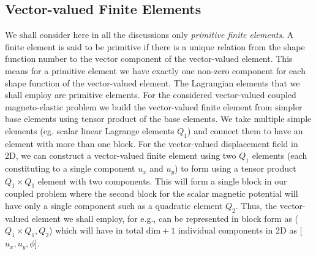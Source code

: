 \documentclass[11pt,a4paper,final]{article}
\begin{document}
\subsection{\textbf{Vector-valued Finite Elements}} We shall consider here in all the discussions only \textit{primitive finite elements}. A finite element is said to be primitive if there is a unique relation from the shape function number to the vector component of the vector-valued element. This means for a primitive element we have exactly one non-zero component for each shape function of the vector-valued element. The Lagrangian elements that we shall employ are primitive elements. For the considered vector-valued coupled magneto-elastic problem we build the vector-valued finite element from simpler base elements using tensor product of the base elements. We take multiple simple elements (eg. scalar linear Lagrange elements $Q_1$) and connect them to have an element with more than one block. For the vector-valued displacement field in 2D, we can construct a vector-valued finite element using two $Q_1$ elements (each constituting to a single component $u_x$ and $u_y$) to form using a tensor product $Q_1 \times Q_1$ element with two components. This will form a single block in our coupled problem where the second block for the scalar magnetic potential will have only a single component such as a quadratic element $Q_2$. Thus, the vector-valued element we shall employ, for e.g., can be represented in block form as ($Q_1 \times Q_1, Q_2$) which will have in total $\text{dim}+1$ individual components in 2D as [$u_x, u_y, \phi$]. \newline 

\newpage
\printbibliography
\end{document}
